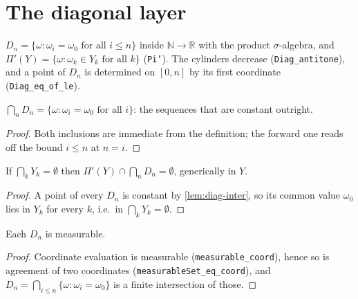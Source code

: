 \section{The diagonal layer}

\begin{definition}
\label{def:diag-cylinders}
\leanok
$D_n = \{\omega : \omega_i = \omega_0 \text{ for all } i \leq n\}$ inside
$\mathbb{N} \to \mathbb{R}$ with the product $\sigma$-algebra, and
$\Pi'(Y) = \{\omega : \omega_k \in Y_k \text{ for all } k\}$ (\texttt{Pi'}).
The cylinders decrease (\texttt{Diag\_antitone}), and a point of $D_n$ is
determined on $[0,n]$ by its first coordinate (\texttt{Diag\_eq\_of\_le}).
\end{definition}

\begin{lemma}
\label{lem:diag-inter}
\leanok
{}
$\bigcap_n D_n = \{\omega : \omega_i = \omega_0 \text{ for all } i\}$: the
sequences that are constant outright.
\end{lemma}

\begin{proof}
\leanok
Both inclusions are immediate from the definition; the forward one reads off the
bound $i \leq n$ at $n = i$.
\end{proof}

\begin{theorem}
\label{thm:diag-empty}
\leanok
{}
  If $\bigcap_k Y_k = \emptyset$ then $\Pi'(Y) \cap \bigcap_n D_n = \emptyset$,
generically in $Y$.
\end{theorem}

\begin{proof}
\leanok
{}
A point of every $D_n$ is constant by \ref{lem:diag-inter}, so its common value
$\omega_0$ lies in $Y_k$ for every $k$, i.e.\ in $\bigcap_k Y_k = \emptyset$.
\end{proof}

\begin{lemma}
\label{lem:diag-measurable}
\leanok
{}
Each $D_n$ is measurable.
\end{lemma}

\begin{proof}
\leanok
Coordinate evaluation is measurable (\texttt{measurable\_coord}), hence so is
agreement of two coordinates (\texttt{measurableSet\_eq\_coord}), and
$D_n = \bigcap_{i \leq n} \{\omega : \omega_i = \omega_0\}$ is a finite
intersection of those.
\end{proof}

